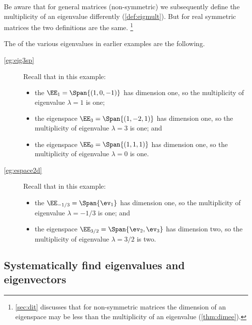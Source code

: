 Be aware that for general matrices (non-symmetric) we subsequently define the multiplicity of an eigenvalue differently (\cref{def:eigmult}).  
But for real symmetric matrices the two definitions are the same.%
\footnote{\cref{sec:dit} discusses that for non-symmetric matrices the dimension of an eigenspace may be less than the multiplicity of an eigenvalue (\cref{thm:dimee}).}



\begin{example} 
The  of the various eigenvalues in earlier examples are the following.
\begin{description}
\item[\cref{eg:eig3sp}] Recall that in this example:
\begin{itemize}
\item the  \(\EE_1=\Span\{(1,0,-1)\}\) has dimension one, so the multiplicity of eigenvalue \(\lambda=1\) is one;
\item the eigenspace \(\EE_3=\Span\{(1,-2,1)\}\) has dimension one, so the multiplicity of eigenvalue \(\lambda=3\) is one; and
\item the eigenspace \(\EE_0=\Span\{(1,1,1)\}\) has dimension one, so the multiplicity of eigenvalue \(\lambda=0\) is one.
\end{itemize}

\item[\cref{eg:espace2d}] Recall that in this example: 
\begin{itemize}
\item the  \(\EE_{-1/3}=\Span\{\ev_1\}\) has dimension one, so the multiplicity of eigenvalue \(\lambda=-1/3\) is one; and
\item the eigenspace \(\EE_{3/2}=\Span\{\ev_2,\ev_3\}\) has dimension two, so the multiplicity of eigenvalue \(\lambda=3/2\) is two.
\end{itemize}

\end{description}
\end{example}














\subsection{Systematically find eigenvalues and eigenvectors}

